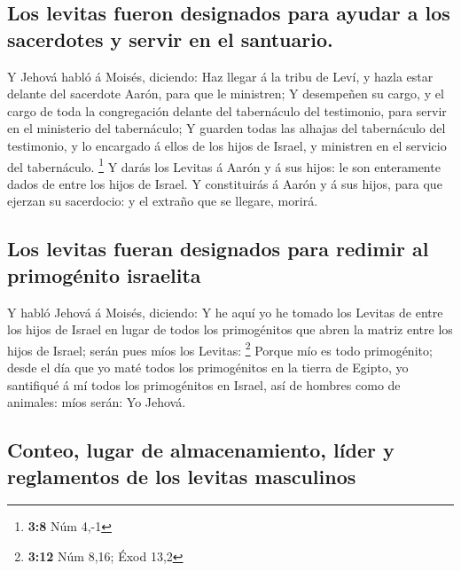 \hypertarget{los-levitas-fueron-designados-para-ayudar-a-los-sacerdotes-y-servir-en-el-santuario.}{%
\subsection{Los levitas fueron designados para ayudar a los sacerdotes y
servir en el
santuario.}\label{los-levitas-fueron-designados-para-ayudar-a-los-sacerdotes-y-servir-en-el-santuario.}}

 Y Jehová habló á Moisés, diciendo:  Haz
llegar á la tribu de Leví, y hazla estar delante del sacerdote Aarón,
para que le ministren;  Y desempeñen su cargo, y el cargo
de toda la congregación delante del tabernáculo del testimonio, para
servir en el ministerio del tabernáculo;  Y guarden todas
las alhajas del tabernáculo del testimonio, y lo encargado á ellos de
los hijos de Israel, y ministren en el servicio del tabernáculo.
\footnote{\textbf{3:8} Núm 4,-1}  Y darás los Levitas á
Aarón y á sus hijos: le son enteramente dados de entre los hijos de
Israel.  Y constituirás á Aarón y á sus hijos, para que
ejerzan su sacerdocio: y el extraño que se llegare, morirá.

\hypertarget{los-levitas-fueran-designados-para-redimir-al-primoguxe9nito-israelita}{%
\subsection{Los levitas fueran designados para redimir al primogénito
israelita}\label{los-levitas-fueran-designados-para-redimir-al-primoguxe9nito-israelita}}

 Y habló Jehová á Moisés, diciendo:  Y he
aquí yo he tomado los Levitas de entre los hijos de Israel en lugar de
todos los primogénitos que abren la matriz entre los hijos de Israel;
serán pues míos los Levitas: \footnote{\textbf{3:12} Núm 8,16; Éxod 13,2}
 Porque mío es todo primogénito; desde el día que yo maté
todos los primogénitos en la tierra de Egipto, yo santifiqué á mí todos
los primogénitos en Israel, así de hombres como de animales: míos serán:
Yo Jehová.

\hypertarget{conteo-lugar-de-almacenamiento-luxedder-y-reglamentos-de-los-levitas-masculinos}{%
\subsection{Conteo, lugar de almacenamiento, líder y reglamentos de los
levitas
masculinos}\label{conteo-lugar-de-almacenamiento-luxedder-y-reglamentos-de-los-levitas-masculinos}}

